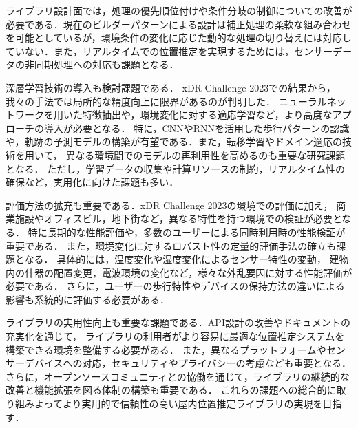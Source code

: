 ライブラリ設計面では，処理の優先順位付けや条件分岐の制御についての改善が必要である．現在のビルダーパターンによる設計は補正処理の柔軟な組み合わせを可能としているが，環境条件の変化に応じた動的な処理の切り替えには対応していない．また，リアルタイムでの位置推定を実現するためには，センサーデータの非同期処理への対応も課題となる．

深層学習技術の導入も検討課題である．
xDR Challenge 2023での結果から，我々の手法では局所的な精度向上に限界があるのが判明した．
ニューラルネットワークを用いた特徴抽出や，環境変化に対する適応学習など，より高度なアプローチの導入が必要となる．
特に，CNNやRNNを活用した歩行パターンの認識や，軌跡の予測モデルの構築が有望である．また，転移学習やドメイン適応の技術を用いて，
異なる環境間でのモデルの再利用性を高めるのも重要な研究課題となる．
ただし，学習データの収集や計算リソースの制約，リアルタイム性の確保など，実用化に向けた課題も多い．

評価方法の拡充も重要である．xDR Challenge 2023の環境での評価に加え，
商業施設やオフィスビル，地下街など，異なる特性を持つ環境での検証が必要となる．
特に長期的な性能評価や，多数のユーザーによる同時利用時の性能検証が重要である．
また，環境変化に対するロバスト性の定量的評価手法の確立も課題となる．
具体的には，温度変化や湿度変化によるセンサー特性の変動，
建物内の什器の配置変更，電波環境の変化など，様々な外乱要因に対する性能評価が必要である．
さらに，ユーザーの歩行特性やデバイスの保持方法の違いによる影響も系統的に評価する必要がある．

ライブラリの実用性向上も重要な課題である．API設計の改善やドキュメントの充実化を通じて，
ライブラリの利用者がより容易に最適な位置推定システムを構築できる環境を整備する必要がある．
また，異なるプラットフォームやセンサーデバイスへの対応，セキュリティやプライバシーの考慮なども重要となる．
さらに，オープンソースコミュニティとの協働を通じて，ライブラリの継続的な改善と機能拡張を図る体制の構築も重要である．
これらの課題への総合的に取り組みよってより実用的で信頼性の高い屋内位置推定ライブラリの実現を目指す．

